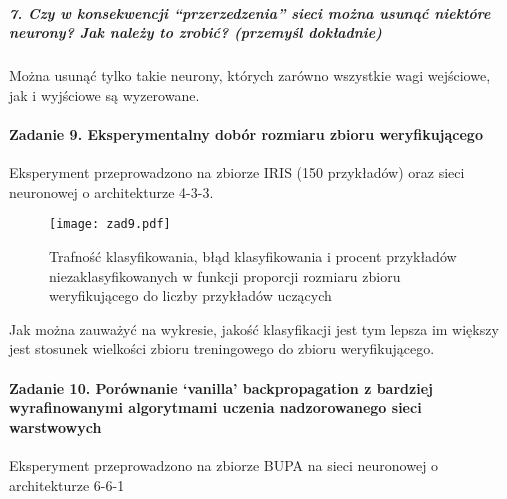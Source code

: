 \documentclass{article}
\begin{document}
\subparagraph{7. Czy w konsekwencji “przerzedzenia” sieci można usunąć niektóre neurony? Jak należy to zrobić? (przemyśl dokładnie)}
Można usunąć tylko takie neurony, których zarówno wszystkie wagi wejściowe, jak i wyjściowe są wyzerowane. 

\paragraph{Zadanie 9. Eksperymentalny dobór rozmiaru zbioru weryfikującego}
Eksperyment przeprowadzono na zbiorze IRIS (150 przykładów) oraz sieci neuronowej o architekturze 4-3-3.

\begin{figure}[H]
\begin{center}
\texttt{[image: zad9.pdf]}
\end{center}
\caption{Trafność klasyfikowania, błąd klasyfikowania i procent przykładów niezaklasyfikowanych w funkcji proporcji rozmiaru zbioru weryfikującego do liczby przykładów uczących}
\label{fig-1Tdelta}
\end{figure}

Jak można zauważyć na wykresie, jakość klasyfikacji jest tym lepsza im większy jest stosunek wielkości zbioru treningowego do zbioru weryfikującego. 

\paragraph{Zadanie 10. Porównanie ‘vanilla’ backpropagation z bardziej wyrafinowanymi algorytmami uczenia nadzorowanego sieci warstwowych}

Eksperyment przeprowadzono na zbiorze BUPA na sieci neuronowej o architekturze 6-6-1
\end{document}
